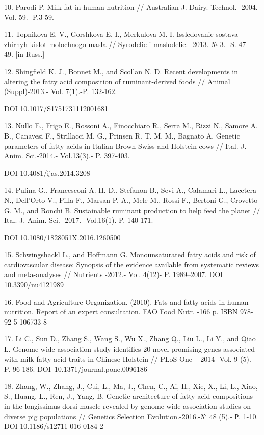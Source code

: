 10. Parodi P. Milk fat in human nutrition // Australian J. Dairy.
Technol. -2004.-Vol. 59.- P.3-59.

11. Topnikova E. V., Gorshkova E. I., Merkulova M. I. Issledovanie
sostava zhirnyh kislot molochnogo masla // Syrodelie i maslodelie.-
2013.-№ 3.- S. 47 - 49. {[}in Russ.{]}

12. Shingfield K. J., Bonnet M., and Scollan N. D. Recent developments
in altering the fatty acid composition of ruminant-derived foods //
Animal (Suppl)-2013.- Vol. 7(1).-P. 132-162.

DOI 10.1017/S1751731112001681

13. Nullo E., Frigo E., Rossoni A., Finocchiaro R., Serra M., Rizzi N.,
Samore A. B., Canavesi F., Strillacci M. G., Prinsen R. T. M. M.,
Bagnato A. Genetic parameters of fatty acids in Italian Brown Swiss and
Holstein cows // Ital. J. Anim. Sci.-2014.- Vol.13(3).- P. 397-403.

DOI 10.4081/ijas.2014.3208

14. Pulina G., Francesconi A. H. D., Stefanon B., Sevi A., Calamari L.,
Lacetera N., Dell'Orto V., Pilla F., Marsan P. A., Mele M., Rossi F.,
Bertoni G., Crovetto G. M., and Ronchi B. Sustainable ruminant
production to help feed the planet // Ital. J. Anim. Sci.- 2017.-
Vol.16(1).-P. 140-171.

DOI 10.1080/1828051X.2016.1260500

15. Schwingshackl L., and Hoffmann G. Monounsaturated fatty acids and
risk of cardiovascular disease: Synopsis of the evidence available from
systematic reviews and meta-analyses // Nutrients -2012.- Vol. 4(12)- P.
1989--2007. DOI 10.3390/nu4121989

16. Food and Agriculture Organization. (2010). Fats and fatty acids in
human nutrition. Report of an expert consultation. FAO Food Nutr. -166
p. ISBN 978-92-5-106733-8

17. Li C., Sun D., Zhang S., Wang S., Wu X., Zhang Q., Liu L., Li Y.,
and Qiao L. Genome wide association study identifies 20 novel promising
genes associated with milk fatty acid traits in Chinese Holstein // PLoS
One -- 2014- Vol. 9 (5). - P. 96-186. DOI~10.1371/journal.pone.0096186

18. Zhang, W., Zhang, J., Cui, L., Ma, J., Chen, C., Ai, H., Xie, X.,
Li, L., Xiao, S., Huang, L., Ren, J., Yang, B. Genetic architecture of
fatty acid compositions in the longissimus dorsi muscle revealed by
genome-wide association studies on diverse pig populations // Genetics
Selection Evolution.-2016.-№ 48 (5).- Р. 1-10. DOI
10.1186/s12711-016-0184-2

